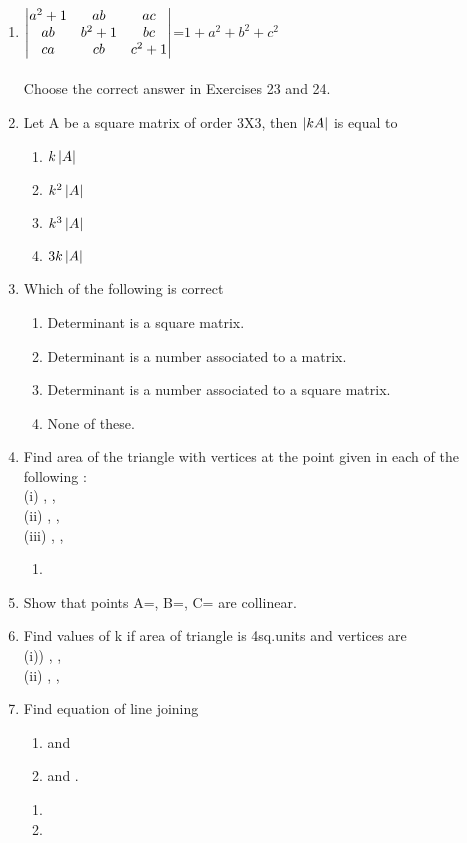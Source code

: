 \documentclass[journal,12pt,twocolumn]{IEEEtran}
\renewcommand\thesection{\arabic{section}}
\begin{document}
\begin{enumerate}[label=\thesection.\arabic*.,ref=\thesection.\theenumi]
\item $\begin{vmatrix}a^2+1&ab&ac \\ ab&b^2+1&bc \\ ca&cb&c^2+1\end{vmatrix}$=$1+a^2+b^2+c^2$\\
\\
\solution 
%
Choose the correct answer in Exercises 23 and 24.
\item Let A be a square matrix of order 3X3, then 
$\left\vert kA\right\vert$ is equal to
\begin{enumerate}
\item $k\left\vert A\right\vert$
\item $k^2\left\vert A\right\vert$
\item $k^3\left\vert A\right\vert$
\item $3k\left\vert A\right\vert$
\end{enumerate} 
\item Which of the following is correct
\begin{enumerate}
\item Determinant is a square matrix.
\item Determinant is a number associated to a matrix.
\item Determinant is a number associated to a square matrix.
\item None of these.
\end{enumerate}
\item Find area of the triangle with vertices at the point given in each of the following :\\
(i) , , \\
(ii) , , \\
(iii) , , \\
\solution 
\begin{enumerate}
    \item 
    

\end{enumerate}
\item Show that points A=, B=, C= are collinear.
\\
\solution 
%
\item Find values of k if area of triangle is 4sq.units and vertices are \\
(i)) , ,  \\ (ii) , , 
\item Find equation of line joining
\begin{enumerate}
\item  {} and  
\item {} and .
\end{enumerate}
\solution
\begin{enumerate}
    \item %
    \item %
    

\end{enumerate}
\end{enumerate}
\end{document}
